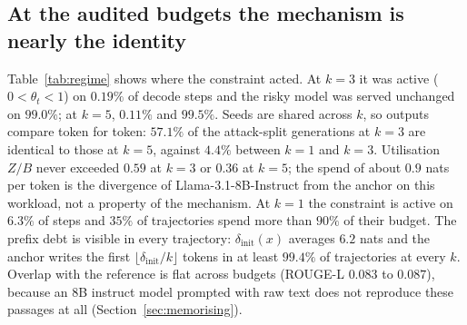 \subsection{At the audited budgets the mechanism is nearly the identity}\label{sec:regime}
Table~\ref{tab:regime} shows where the constraint acted. At $k=3$ it was active ($0<\theta_t<1$) on $0.19\%$ of decode steps and the risky model was served unchanged on $99.0\%$; at $k=5$, $0.11\%$ and $99.5\%$. Seeds are shared across $k$, so outputs compare token for token: $57.1\%$ of the attack-split generations at $k=3$ are identical to those at $k=5$, against $4.4\%$ between $k=1$ and $k=3$. Utilisation $Z/B$ never exceeded $0.59$ at $k=3$ or $0.36$ at $k=5$; the spend of about $0.9$ nats per token is the divergence of Llama-3.1-8B-Instruct from the anchor on this workload, not a property of the mechanism. At $k=1$ the constraint is active on $6.3\%$ of steps and $35\%$ of trajectories spend more than $90\%$ of their budget. The prefix debt is visible in every trajectory: $\delta_{\mathrm{init}}(x)$ averages $6.2$ nats and the anchor writes the first $\lfloor \delta_{\mathrm{init}}/k \rfloor$ tokens in at least $99.4\%$ of trajectories at every $k$. Overlap with the reference is flat across budgets (ROUGE-L $0.083$ to $0.087$), because an 8B instruct model prompted with raw text does not reproduce these passages at all (Section~\ref{sec:memorising}).

\begin{table}[t]
\centering
\caption{Released logs on the CopyBench attack split, and on the test split at $k=3$ ($T_{\max}=200$, temperature 1). Activity is the fraction of decode steps with $0<\theta_t<1$; ``identical'' compares token for token with the next larger $k$ on the same prompt and seed; $L(y)$ is the realised log-likelihood ratio.}
\label{tab:regime}
\small
{}
\end{table}

